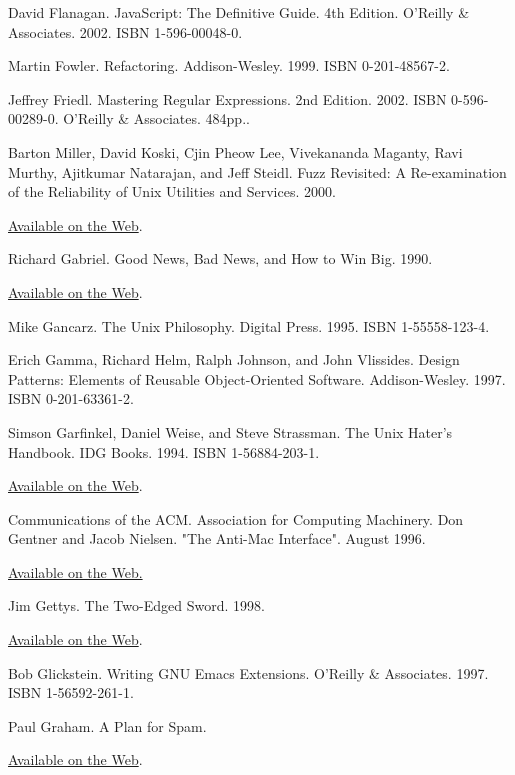 \documentclass[12pt,oneside]{ctexbook}
\begin{document}
\begin{common-format}
\begin{thebibliography}{9}
 David Flanagan. JavaScript: The Definitive Guide. 4th Edition. O'Reilly \&{} Associates. 2002. ISBN 1-596-00048-0.

 Martin Fowler. Refactoring. Addison-Wesley. 1999. ISBN 0-201-48567-2.

 Jeffrey Friedl. Mastering Regular Expressions. 2nd Edition. 2002. ISBN 0-596-00289-0. O'Reilly \&{} Associates. 484pp..

 Barton Miller, David Koski, Cjin Pheow Lee, Vivekananda Maganty, Ravi Murthy, Ajitkumar Natarajan, and Jeff Steidl. Fuzz Revisited: A Re-examination of the Reliability of Unix Utilities and Services. 2000.

\href{http://www.opensource.org/advocacy/fuzz-revisited.pdf}{Available on the Web}.

 Richard Gabriel. Good News, Bad News, and How to Win Big. 1990.

\href{http://www.dreamsongs.com/WorseIsBetter.html}{Available on the Web}.

 Mike Gancarz. The Unix Philosophy. Digital Press. 1995. ISBN 1-55558-123-4.

 Erich Gamma, Richard Helm, Ralph Johnson, and John Vlissides. Design Patterns: Elements of Reusable Object-Oriented Software. Addison-Wesley. 1997. ISBN 0-201-63361-2.

 Simson Garfinkel, Daniel Weise, and Steve Strassman. The Unix Hater's Handbook. IDG Books. 1994. ISBN 1-56884-203-1.

\href{http://research.microsoft.com/~daniel/unix-haters.html}{Available on the Web}.

 Communications of the ACM. Association for Computing Machinery. Don Gentner and Jacob Nielsen. "The Anti-Mac Interface". August 1996.

\href{http://www.acm.org/cacm/AUG96/antimac.htm}{Available on the Web.}

 Jim Gettys. The Two-Edged Sword. 1998.

\href{http://freshmeat.net/articles/view/122/}{Available on the Web}.

 Bob Glickstein. Writing GNU Emacs Extensions. O'Reilly \&{} Associates. 1997. ISBN 1-56592-261-1.

 Paul Graham. A Plan for Spam.

\href{http://www.paulgraham.com/spam.html}{Available on the Web}.


\end{thebibliography}
\end{common-format}
\end{document}
